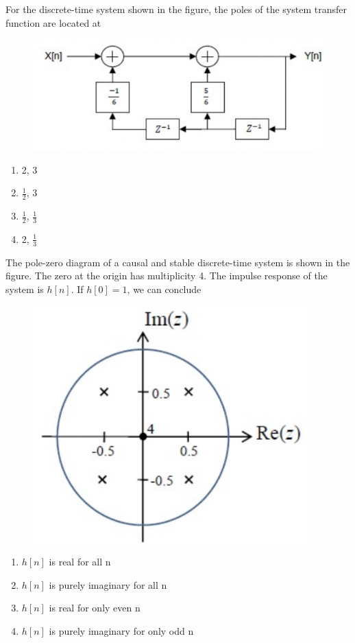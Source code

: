     \hfill{}

    \item For the discrete-time system shown in the figure, the poles of the system transfer function are located at
    \begin{figure}[H]
        \centering
        \includegraphics[width=0.6\columnwidth]{figs/q54.png}
        \caption*{}
        \label{fig:q54}
    \end{figure}
    \begin{enumerate}
        \item 2, 3
        \item $\frac{1}{2}$, 3
        \item $\frac{1}{2}$, $\frac{1}{3}$
        \item 2, $\frac{1}{3}$
    \end{enumerate}
    
    \hfill{}

    \item The pole-zero diagram of a causal and stable discrete-time system is shown in the figure. The zero at the origin has multiplicity 4. The impulse response of the system is $h[n]$. If $h[0]=1$, we can conclude
    \begin{figure}[H]
        \centering
        \includegraphics[width=0.4\columnwidth]{figs/q55.png}
        \caption*{}
        \label{fig:q55}
    \end{figure}
    \begin{enumerate}
        \item $h[n]$ is real for all n
        \item $h[n]$ is purely imaginary for all n
        \item $h[n]$ is real for only even n
        \item $h[n]$ is purely imaginary for only odd n
    \end{enumerate}
    
